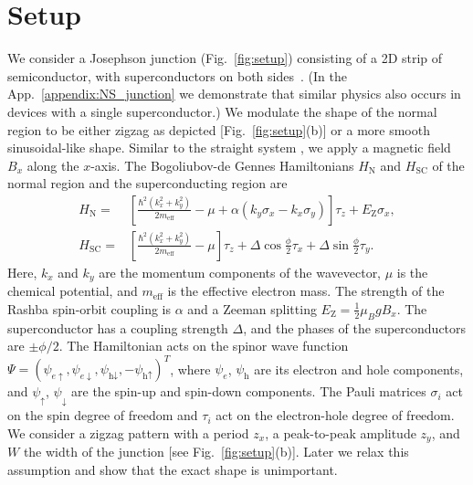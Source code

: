 \section{Setup}\label{sec:setup}

We consider a Josephson junction (Fig.~\ref{fig:setup}) consisting of a 2D strip of semiconductor, with superconductors on both sides~\cite{Pientka2017,Hell2017}.
(In the App.~\ref{appendix:NS_junction} we demonstrate that similar physics also occurs in devices with a single superconductor.)
We modulate the shape of the normal region to be either zigzag as depicted [Fig.~\ref{fig:setup}(b)] or a more smooth sinusoidal-like shape.
Similar to the straight system \cite{Pientka2017}, we apply a magnetic field $B_x$ along the $x$-axis.
The Bogoliubov-de Gennes Hamiltonians $H_\textrm{N}$ and $H_\textrm{SC}$ of the normal region and the superconducting region are
\begin{subequations}
\begin{align}
    H_\textrm{N} = & \left[\frac{\hbar^2\left(k_x^2 + k_y^2\right)}{2m_\text{eff}} - \mu + \alpha \left( k_y \sigma_x - k_x \sigma_y \right) \right] \tau_z
        + E_\text{Z} \sigma_x, \\
    H_\textrm{SC} = & \left[\frac{\hbar^2\left(k_x^2 + k_y^2\right)}{2m_\text{eff}} - \mu\right] \tau_z
        + \Delta \cos{\frac{\phi}{2}} \tau_x + \Delta \sin{\frac{\phi}{2}} \tau_y.
\end{align}
\label{eq:hamiltonian}
\end{subequations}
Here, $k_x$ and $k_y$ are the momentum components of the wavevector, $\mu$ is the chemical potential, and $m_\textrm{eff}$ is the effective electron mass.
The strength of the Rashba spin-orbit coupling is $\alpha$ and a Zeeman splitting $E_\text{Z}=\frac{1}{2} \mu_B g B_x$.
The superconductor has a coupling strength $\Delta$, and the phases of the superconductors are $\pm\phi/2$.
The Hamiltonian acts on the spinor wave function $\Psi={\left(\psi_{e\uparrow},\psi_{e\downarrow},\psi_{\textrm{h}\downarrow},-\psi_{\textrm{h}\uparrow}\right)}^{T}$, where $\psi_e$, $\psi_\textrm{h}$ are its electron and hole components, and $\psi_\uparrow$, $\psi_\downarrow$ are the spin-up and spin-down components.
The Pauli matrices $\sigma_{i}$ act on the spin degree of freedom and $\tau_{i}$ act on the electron-hole degree of freedom.
We consider a zigzag pattern with a period $z_x$, a peak-to-peak amplitude $z_y$, and $W$ the width of the junction [see Fig.~\ref{fig:setup}(b)].
Later we relax this assumption and show that the exact shape is unimportant.

